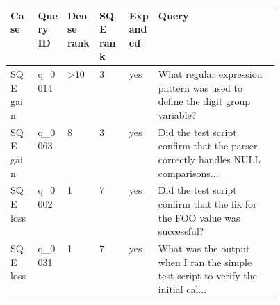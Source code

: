 \begin{tabular}{lllllp{0.45\linewidth}}
\toprule
Case & Query ID & Dense rank & SQE rank & Expanded & Query \\
\midrule
SQE gain & q\_0014 & >10 & 3 & yes & What regular expression pattern was used to define the digit group variable? \\
SQE gain & q\_0063 & 8 & 3 & yes & Did the test script confirm that the parser correctly handles NULL comparisons... \\
SQE loss & q\_0002 & 1 & 7 & yes & Did the test script confirm that the fix for the FOO value was successful? \\
SQE loss & q\_0031 & 1 & 7 & yes & What was the output when I ran the simple test script to verify the initial cal... \\
\bottomrule
\end{tabular}
